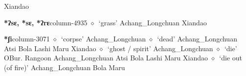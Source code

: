          Xiandao 
  \item {\footnotesize \textbf{*ʔsɛ, *sɛ, *ʔrɛ}}{\tiny column-4935}
         $\diamond$~`grass'
         Achang\_Longchuan 
\hspace{1ex}
         Xiandao 
  \item {\footnotesize \textbf{*ʃi}}{\tiny column-3071}
         $\diamond$~`corpse'
         Achang\_Longchuan 
\hspace{1ex}
         $\diamond$~`dead'
         Achang\_Longchuan 
\hspace{1ex}
         Atsi 
\hspace{1ex}
         Bola 
\hspace{1ex}
         Lashi 
\hspace{1ex}
         Maru 
\hspace{1ex}
         Xiandao 
\hspace{1ex}
         $\diamond$~`ghost / spirit'
         Achang\_Longchuan 
\hspace{1ex}
         $\diamond$~`die'
         OBur. 
\hspace{1ex}
         Rangoon 
\hspace{1ex}
         Achang\_Longchuan 
\hspace{1ex}
         Atsi 
\hspace{1ex}
         Bola 
\hspace{1ex}
         Lashi 
\hspace{1ex}
         Maru 
\hspace{1ex}
         Xiandao 
\hspace{1ex}
         $\diamond$~`die out (of fire)'
         Achang\_Longchuan 
\hspace{1ex}
         Bola 
\hspace{1ex}
         Maru 
\hspace{1ex}
